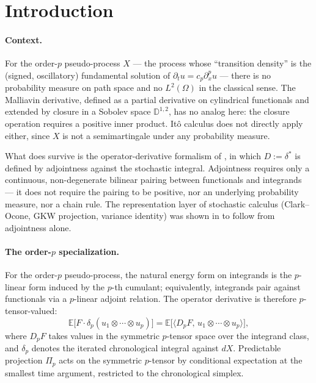 \documentclass[11pt,reqno]{amsart}
\theoremstyle{plain}
\theoremstyle{definition}
\newcommand{\E}{\mathbb{E}}
\begin{document}
\section{Introduction}

\paragraph{Context.}
For the order-$p$ pseudo-process $X$ --- the process whose ``transition density'' is the (signed, oscillatory) fundamental solution of $\partial_t u = c_p \partial_x^p u$ --- there is no probability measure on path space and no $L^2(\Omega)$ in the classical sense. The Malliavin derivative, defined as a partial derivative on cylindrical functionals and extended by closure in a Sobolev space $\mathbb{D}^{1,2}$, has no analog here: the closure operation requires a positive inner product. Itô calculus does not directly apply either, since $X$ is not a semimartingale under any probability measure.

What does survive is the operator-derivative formalism of \cite{operatorDerivativeI}, in which $D := \delta^*$ is defined by adjointness against the stochastic integral. Adjointness requires only a continuous, non-degenerate bilinear pairing between functionals and integrands --- it does not require the pairing to be positive, nor an underlying probability measure, nor a chain rule. The representation layer of stochastic calculus (Clark--Ocone, GKW projection, variance identity) was shown in \cite{operatorDerivativeI} to follow from adjointness alone.

\paragraph{The order-$p$ specialization.}
For the order-$p$ pseudo-process, the natural energy form on integrands is the $p$-linear form induced by the $p$-th cumulant; equivalently, integrands pair against functionals via a $p$-linear adjoint relation. The operator derivative is therefore $p$-tensor-valued:
\begin{equation}
\label{eq:adjoint}
\E\bigl[F \cdot \delta_p(u_1 \otimes \cdots \otimes u_p)\bigr]
= \E\bigl[\bigl\langle D_p F,\, u_1 \otimes \cdots \otimes u_p\bigr\rangle\bigr],
\end{equation}
where $D_p F$ takes values in the symmetric $p$-tensor space over the integrand class, and $\delta_p$ denotes the iterated chronological integral against $dX$. Predictable projection $\Pi_p$ acts on the symmetric $p$-tensor by conditional expectation at the smallest time argument, restricted to the chronological simplex.
\end{document}
